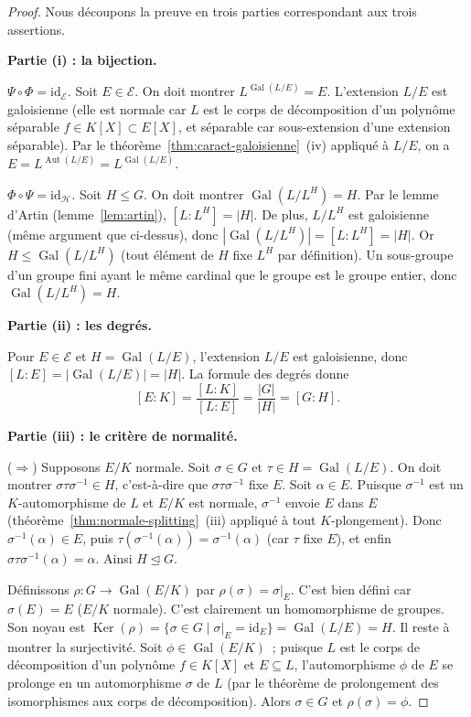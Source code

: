 \documentclass[12pt,a4paper,openany]{book}
\theoremstyle{definition}
\newcommand{\Gal}{\operatorname{Gal}}
\newcommand{\Aut}{\operatorname{Aut}}
\newcommand{\Ker}{\operatorname{Ker}}
\begin{document}
\begin{proof}
Nous découpons la preuve en trois parties correspondant aux trois assertions.

\medskip\noindent
\textbf{Partie (i) : la bijection.}

\emph{$\Psi \circ \Phi = \mathrm{id}_{\mathcal{E}}$.}
Soit $E \in \mathcal{E}$. On doit montrer $L^{\Gal(L/E)} = E$.
L'extension $L/E$ est galoisienne (elle est normale car $L$ est le corps de
décomposition d'un polynôme séparable $f \in K[X] \subset E[X]$, et
séparable car sous-extension d'une extension séparable). Par le
théorème~\ref{thm:caract-galoisienne}~(iv) appliqué à $L/E$, on a
$E = L^{\Aut(L/E)} = L^{\Gal(L/E)}$.

\emph{$\Phi \circ \Psi = \mathrm{id}_{\mathcal{H}}$.}
Soit $H \leq G$. On doit montrer $\Gal(L/L^H) = H$. Par le lemme d'Artin
(lemme~\ref{lem:artin}), $[L:L^H] = |H|$. De plus, $L/L^H$ est galoisienne
(même argument que ci-dessus), donc $|\Gal(L/L^H)| = [L:L^H] = |H|$.
Or $H \leq \Gal(L/L^H)$ (tout élément de $H$ fixe $L^H$ par définition).
Un sous-groupe d'un groupe fini ayant le même cardinal que le groupe est le
groupe entier, donc $\Gal(L/L^H) = H$.

\medskip\noindent
\textbf{Partie (ii) : les degrés.}

Pour $E \in \mathcal{E}$ et $H = \Gal(L/E)$, l'extension $L/E$ est
galoisienne, donc $[L:E] = |\Gal(L/E)| = |H|$. La formule des degrés donne
\[
  [E:K] = \frac{[L:K]}{[L:E]} = \frac{|G|}{|H|} = [G:H].
\]

\medskip\noindent
\textbf{Partie (iii) : le critère de normalité.}

($\Rightarrow$) Supposons $E/K$ normale. Soit $\sigma \in G$ et
$\tau \in H = \Gal(L/E)$. On doit montrer $\sigma\tau\sigma^{-1} \in H$,
c'est-à-dire que $\sigma\tau\sigma^{-1}$ fixe $E$. Soit $\alpha \in E$.
Puisque $\sigma^{-1}$ est un $K$-automorphisme de $L$ et $E/K$ est
normale, $\sigma^{-1}$ envoie $E$ dans $E$ (théorème~\ref{thm:normale-splitting}~(iii)
appliqué à tout $K$-plongement). Donc $\sigma^{-1}(\alpha) \in E$, puis
$\tau(\sigma^{-1}(\alpha)) = \sigma^{-1}(\alpha)$ (car $\tau$ fixe $E$),
et enfin $\sigma\tau\sigma^{-1}(\alpha) = \alpha$. Ainsi $H \trianglelefteq G$.

Définissons $\rho \colon G \to \Gal(E/K)$ par $\rho(\sigma) = \sigma|_E$.
C'est bien défini car $\sigma(E) = E$ ($E/K$ normale). C'est clairement un
homomorphisme de groupes. Son noyau est
$\Ker(\rho) = \{\sigma \in G \mid \sigma|_E = \mathrm{id}_E\} = \Gal(L/E) = H$.
Il reste à montrer la surjectivité. Soit $\phi \in \Gal(E/K)$~; puisque
$L$ est le corps de décomposition d'un polynôme $f \in K[X]$ et
$E \subseteq L$, l'automorphisme $\phi$ de $E$ se prolonge en un automorphisme
$\sigma$ de $L$ (par le théorème de prolongement des isomorphismes aux corps
de décomposition). Alors $\sigma \in G$ et $\rho(\sigma) = \phi$.


\end{proof}
\end{document}

